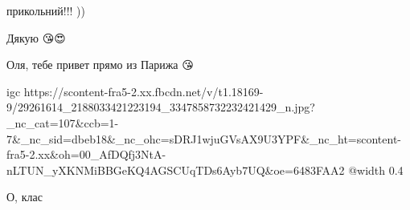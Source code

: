 
прикольний!!! ))

\begin{itemize} %
Дякую 😘😍
\end{itemize} %


Оля, тебе привет прямо из Парижа 😘

\ifcmt
  igc https://scontent-fra5-2.xx.fbcdn.net/v/t1.18169-9/29261614_2188033421223194_3347858732232421429_n.jpg?_nc_cat=107&ccb=1-7&_nc_sid=dbeb18&_nc_ohc=sDRJ1wjuGVsAX9U3YPF&_nc_ht=scontent-fra5-2.xx&oh=00_AfDQfj3NtA-nLTUN_yXKNMiBBGeKQ4AGSCUqTDs6Ayb7UQ&oe=6483FAA2
	@width 0.4
\fi

\begin{itemize} %
О, клас
\end{itemize} %
